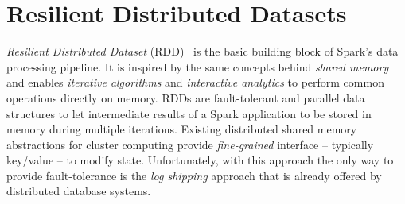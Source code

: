 \section{Resilient Distributed Datasets}
\label{sp:rdd}

\emph{Resilient Distributed Dataset} (RDD)~\cite{Zaharia:2012} is the basic building block of Spark's data processing pipeline. It is inspired by the same concepts behind \emph{shared memory} and enables \emph{iterative algorithms} and \emph{interactive analytics} to perform common operations directly on memory. RDDs are fault-tolerant and parallel data structures to let intermediate results of a Spark application to be stored in memory during multiple iterations. Existing distributed shared memory abstractions for cluster computing provide \emph{fine-grained} interface -- typically key/value -- to modify state. Unfortunately, with this approach the only way to provide fault-tolerance is the \emph{log shipping} approach that is already offered by distributed database systems.

